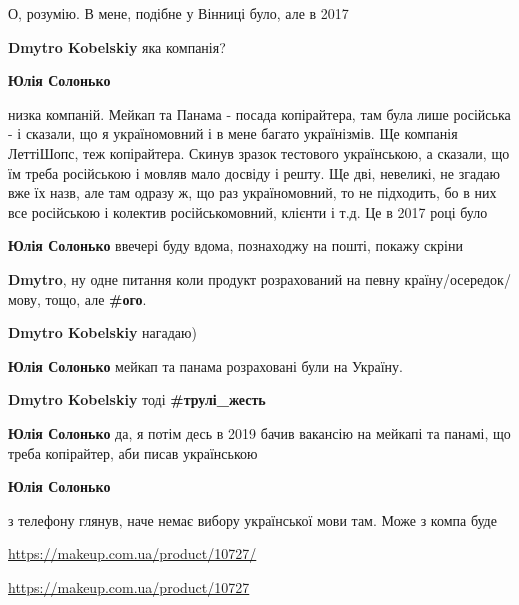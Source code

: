  
 
 
 
 

О, розумію. В мене, подібне у Вінниці було, але в 2017

\begin{itemize} %
\textbf{Dmytro Kobelskiy} яка компанія?

\textbf{Юлія Солонько} 

низка компаній. Мейкап та Панама - посада копірайтера, там була лише російська
- і сказали, що я україномовний і в мене багато українізмів. Ще компанія
ЛеттіШопс, теж копірайтера. Скинув зразок тестового українською, а сказали, що
їм треба російською і мовляв мало досвіду і решту. Ще дві, невеликі, не згадаю
вже їх назв, але там одразу ж, що раз україномовний, то не підходить, бо в них
все російською і колектив російськомовний, клієнти і т.д. Це в 2017 році було

\textbf{Юлія Солонько} ввечері буду вдома, познаходжу на пошті, покажу скріни

\textbf{Dmytro}, ну одне питання коли продукт розрахований на певну країну/осередок/мову, тощо, але \textbf{\#ого}.

\textbf{Dmytro Kobelskiy} нагадаю)

\textbf{Юлія Солонько} мейкап та панама розраховані були на Україну.

\textbf{Dmytro Kobelskiy} тоді \textbf{\#трулі\_жесть}

\textbf{Юлія Солонько} да, я потім десь в 2019 бачив вакансію на мейкапі та панамі, що треба копірайтер, аби писав українською

\textbf{Юлія Солонько} 

з телефону глянув, наче немає вибору української мови там. Може з компа буде 

\url{https://makeup.com.ua/product/10727/}

\url{https://makeup.com.ua/product/10727}


\end{itemize}

